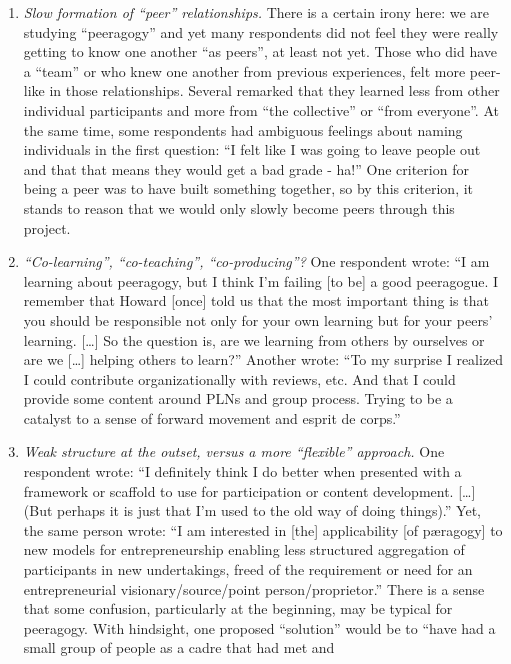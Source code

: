 \begin{enumerate}
\item
  \emph{Slow formation of ``peer'' relationships.} There is a certain
  irony here: we are studying ``peeragogy'' and yet many respondents did
  not feel they were really getting to know one another ``as peers'', at
  least not yet. Those who did have a ``team'' or who knew one another
  from previous experiences, felt more peer-like in those relationships.
  Several remarked that they learned less from other individual
  participants and more from ``the collective'' or ``from everyone''. At
  the same time, some respondents had ambiguous feelings about naming
  individuals in the first question: ``I felt like I was going to leave
  people out and that that means they would get a bad grade - ha!'' One
  criterion for being a peer was to have built something together, so by
  this criterion, it stands to reason that we would only slowly become
  peers through this project.
\item
  \emph{``Co-learning'', ``co-teaching'', ``co-producing''?} One
  respondent wrote: ``I am learning about peeragogy, but I think I'm
  failing {[}to be{]} a good peeragogue. I remember that Howard
  {[}once{]} told us that the most important thing is that you should
  be responsible not only for your own learning but for your peers'
  learning. {[}\ldots{}{]} So the question is, are we learning from
  others by ourselves or are we {[}\ldots{}{]} helping others to
  learn?'' Another wrote: ``To my surprise I realized I could
  contribute organizationally with reviews, etc. And that I could
  provide some content around PLNs and group process. Trying to be a
  catalyst to a sense of forward movement and esprit de corps.''
\item
  \emph{Weak structure at the outset, versus a more ``flexible''
  approach.} One respondent wrote: ``I definitely think I do better when
  presented with a framework or scaffold to use for participation or
  content development. {[}\ldots{}{]} (But perhaps it is just that I'm
  used to the old way of doing things).'' Yet, the same person wrote:
  ``I am interested in {[}the{]} applicability {[}of pæragogy{]} to new
  models for entrepreneurship enabling less structured aggregation of
  participants in new undertakings, freed of the requirement or need for
  an entrepreneurial visionary/source/point person/proprietor.'' There
  is a sense that some confusion, particularly at the beginning, may be
  typical for peeragogy. With hindsight, one proposed ``solution'' would
  be to ``have had a small group of people as a cadre that had met and

\end{enumerate}
